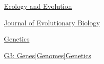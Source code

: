 

\begin{cvpeerreview}

    \vspace{-10mm}
  \cvpeerreviewentry
    {\href{https://onlinelibrary.wiley.com/journal/20457758}{Ecology and Evolution}} %
    \vspace{-2mm}

  \cvpeerreviewentry
    {\href{https://onlinelibrary.wiley.com/journal/14209101}{Journal of Evolutionary Biology}}

  \columnbreak
  
  \cvpeerreviewentry
    {\href{https://academic.oup.com/genetics}{Genetics}} %
    
  \cvpeerreviewentry
    {\href{https://academic.oup.com/g3journal}{G3: Genes|Genomes|Genetics}} %


\vspace{-10mm}

\end{cvpeerreview}
